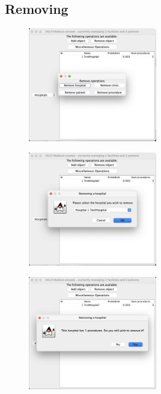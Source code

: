 \documentclass{article}
\begin{document}
\newpage

\subsection{Removing}\label{sub:removing}
\begin{figure}
  \begin{center}
  \includegraphics[width=0.5\textwidth]{./figures/Remove/Hospital_1.png}
  \end{center}
\end{figure}

\begin{figure}
  \begin{center}
  \includegraphics[width=0.5\textwidth]{./figures/Remove/Hospital_2.png}
  \end{center}
\end{figure}

\begin{figure}
  \begin{center}
  \includegraphics[width=0.5\textwidth]{./figures/Remove/Hospital_3.png}
  \end{center}
\end{figure}
\end{document}
